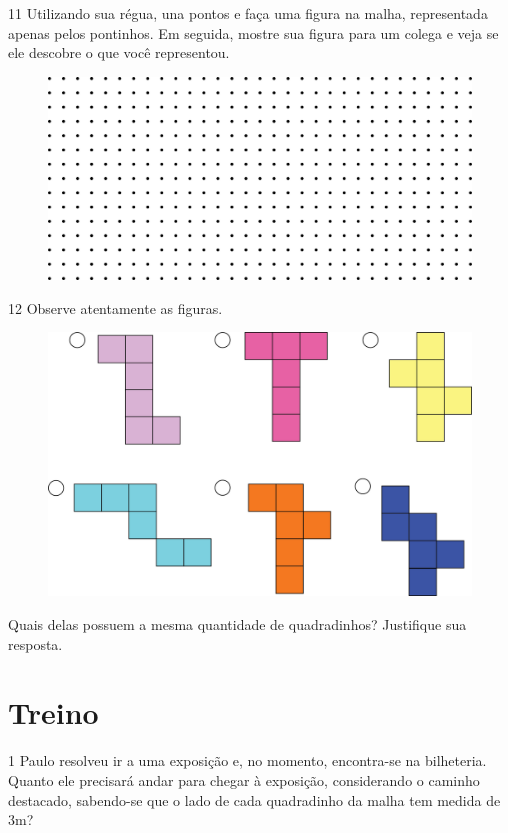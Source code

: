 \pagebreak
\num{11} Utilizando sua régua, una pontos e faça uma figura na malha, representada apenas pelos pontinhos. Em seguida, mostre sua
figura para um colega e veja se ele descobre o que você representou.

\begin{figure}[htpb!]
\includegraphics[width=\textwidth]{./media/image58.png}
\end{figure}


\num{12} Observe atentamente as figuras.

\begin{figure}[htpb!]
\centering
\includegraphics[width=.6\textwidth]{./media/image59.png}
\end{figure}

Quais delas possuem a mesma quantidade de quadradinhos? Justifique sua resposta.

\section*{Treino}

\num{1} Paulo resolveu ir a uma exposição e, no momento, encontra-se na
bilheteria. Quanto ele precisará andar para chegar à exposição,
considerando o caminho destacado, sabendo-se que o lado de cada
quadradinho da malha tem medida de 3m?

